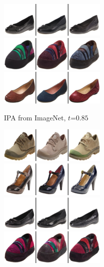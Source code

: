 \begin{figure}[t]
\begin{subfigure}[t]{0.25\textwidth}
      \includegraphics[height=\edgesstuffimgheight]{figs/cigcvae/image-samples/shoes/image_aipo_2_t=0.85_imagenet_samples.png}
      \includegraphics[height=\edgesstuffimgheight]{figs/cigcvae/image-samples/shoes/image_aipo_3_t=0.85_imagenet_samples.png}
      \includegraphics[height=\edgesstuffimgheight]{figs/cigcvae/image-samples/shoes/image_aipo_4_t=0.85_imagenet_samples.png}
      \caption{\scriptsize IPA from ImageNet, $t$=$0.85$}
    \end{subfigure}
    \begin{subfigure}[t]{0.25\textwidth}
      \centering
      \includegraphics[height=\edgesstuffimgheight]{figs/cigcvae/image-samples/shoes/image_aipo_0_imagenet_samples.png}
      \includegraphics[height=\edgesstuffimgheight]{figs/cigcvae/image-samples/shoes/image_aipo_1_imagenet_samples.png}
      \includegraphics[height=\edgesstuffimgheight]{figs/cigcvae/image-samples/shoes/image_aipo_2_imagenet_samples.png}
      \includegraphics[height=\edgesstuffimgheight]{figs/cigcvae/image-samples/shoes/image_aipo_3_imagenet_samples.png}

\end{subfigure}
\end{figure}
